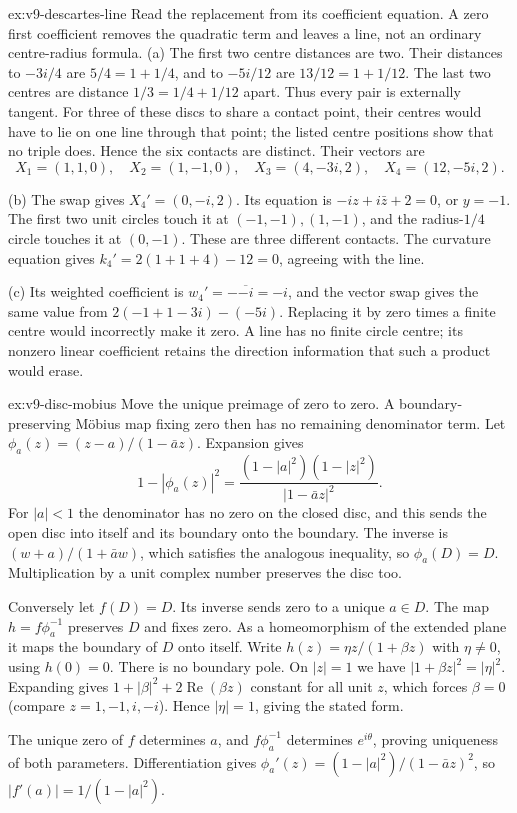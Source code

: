 \begin{solution}{ex:v9-descartes-line}
\idea Read the replacement from its coefficient equation. A zero first coefficient removes the quadratic term and leaves a line, not an ordinary centre-radius formula.
\writeup (a) The first two centre distances are two. Their distances to $-3i/4$ are $5/4=1+1/4$, and to $-5i/12$ are $13/12=1+1/12$. The last two centres are distance $1/3=1/4+1/12$ apart. Thus every pair is externally tangent. For three of these discs to share a contact point, their centres would have to lie on one line through that point; the listed centre positions show that no triple does. Hence the six contacts are distinct. Their vectors are
\[
X_1=(1,1,0),\quad X_2=(1,-1,0),\quad
X_3=(4,-3i,2),\quad X_4=(12,-5i,2).
\]

(b) The swap gives $X_4'=(0,-i,2)$. Its equation is $-iz+i\bar z+2=0$, or $y=-1$. The first two unit circles touch it at $(-1,-1),(1,-1)$, and the radius-$1/4$ circle touches it at $(0,-1)$. These are three different contacts. The curvature equation gives $k_4'=2(1+1+4)-12=0$, agreeing with the line.

(c) Its weighted coefficient is $w_4'=-\overline{-i}=-i$, and the vector swap gives the same value from $2(-1+1-3i)-(-5i)$. Replacing it by zero times a finite centre would incorrectly make it zero. A line has no finite circle centre; its nonzero linear coefficient retains the direction information that such a product would erase.
\end{solution}

\begin{solution}{ex:v9-disc-mobius}
\idea Move the unique preimage of zero to zero. A boundary-preserving M\"obius map fixing zero then has no remaining denominator term.
\writeup Let $\phi_a(z)=(z-a)/(1-\bar az)$. Expansion gives
\[
1-|\phi_a(z)|^2=
\frac{(1-|a|^2)(1-|z|^2)}{|1-\bar az|^2}.
\]
For $|a|<1$ the denominator has no zero on the closed disc, and this sends the open disc into itself and its boundary onto the boundary. The inverse is $(w+a)/(1+\bar aw)$, which satisfies the analogous inequality, so $\phi_a(D)=D$. Multiplication by a unit complex number preserves the disc too.

Conversely let $f(D)=D$. Its inverse sends zero to a unique $a\in D$. The map $h=f\phi_a^{-1}$ preserves $D$ and fixes zero. As a homeomorphism of the extended plane it maps the boundary of $D$ onto itself. Write $h(z)=\eta z/(1+\beta z)$ with $\eta\ne0$, using $h(0)=0$. There is no boundary pole. On $|z|=1$ we have $|1+\beta z|^2=|\eta|^2$. Expanding gives $1+|\beta|^2+2\operatorname{Re}(\beta z)$ constant for all unit $z$, which forces $\beta=0$ (compare $z=1,-1,i,-i$). Hence $|\eta|=1$, giving the stated form.

The unique zero of $f$ determines $a$, and $f\phi_a^{-1}$ determines $e^{i\theta}$, proving uniqueness of both parameters. Differentiation gives
$\phi_a'(z)=(1-|a|^2)/(1-\bar az)^2$, so $|f'(a)|=1/(1-|a|^2)$.
\end{solution}

